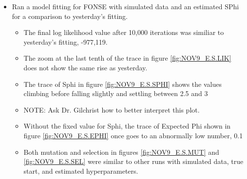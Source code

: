 \documentclass[11pt]{labbook}
\begin{document}
    \begin{itemize}
        \item Ran a model fitting for FONSE with simulated data and an estimated SPhi for a comparison to yesterday's fitting.
            \begin{itemize}
                \item The final log likelihood value after 10,000 iterations was similiar to yesterday's fitting, -977,119.
                \item The zoom at the last tenth of the trace in figure \ref{fig:NOV9_E.S.LIK} does not show the same rise as yesterday.
                \item The trace of Sphi in figure \ref{fig:NOV9_E.S.SPHI} shows the values climbing before falling slightly and settling between 2.5 and 3
                \item NOTE: Ask Dr. Gilchrist how to better interpret this plot.
                \item Without the fixed value for Sphi, the trace of Expected Phi shown in figure \ref{fig:NOV9_E.S.EPHI} once goes to an abnormally low number, 0.1
                \item Both mutation and selection in figures \ref{fig:NOV9_E.S.MUT} and \ref{fig:NOV9_E.S.SEL} were similar to other runs with simulated data, true start, and estimated hyperparameters.
            \end{itemize}
    \end{itemize}
    
\end{document}

